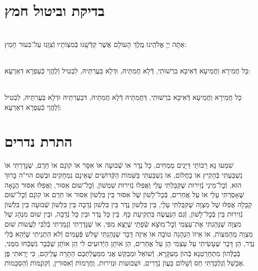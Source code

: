 \documentclass[twoside, openany, parskip=half, 11pt]{book}
\begin{document}
\chapter[בדיקת וביטול חמץ]{ בדיקת וביטול חמץ }

\\
אַתָּה יְיָ אֱלֹהֵֽינוּ מֶֽלֶךְ הָעוֹלָם אֲשֶׁר קִדְּֿשָֽׁנוּ בְּֿמִצְוֹתָיו וְֿצִוָּֽנוּ עַל־בִּעוּר חָמֵץ:


\\
כָּל חֲמִירָא וַחֲמִיעָא דְּֿאִיכָּא בִרְשׁוּתִי, דְּֿלָא חֲמִתֵּיהּ, וּדְלָא בַּעֲרִתֵּיהּ, לִבְטִיל וְֿלֶהֱוֵי כְּֿעַפְרָא דִאַרְעָא:


\\
כָּל חֲמִירָא וַחֲמִיעָא דְּֿאִיכָּא בִרְשׁוּתִי, דַּחֲמִתֵּיהּ דְּֿלָא חֲמִתֵּיהּ, דּבַעַרִתֵּיהּ וּדְלָא בַּעֲרִתֵּיהּ, לִבְטִיל וְֿלֶהֱוֵי כְּֿעַפְרָא דִאַרְעָא:



\chapter[התרת נדרים]{ התרת נדרים }


שִׁמְעוּ נָא רַבּוׂתַי דַּיָּנִים מֻמְחִים, כָּל נֶדֶר אוׂ שְֿׁבוּעָה אוׂ אִסָּר אוׂ קוׂנָם אוׂ חֵרֶם, שֶׁנָּדַרְתִּי אוׂ נִשְׁבַּעְתִּי בְּֿהָקִיץ אוׂ בַחֲלוׂם, אוׂ נִשְׁבַּעְתִּי בַּשֵּׁמוׂת הַקְּֿדוׂשִׁים שֶׁאֵינָם נִמְחָקִים וּבְשֵׁם הוי"ה בָּרוּךְ הוּא, וְֿכׇל־מִינֵי נְֿזִירוּת שֶׁקִּבַּלְתִּי עָלַי וַאֲפִלּוּ נְֿזִירוּת שִׁמְשׁוׂן, וְֿכׇל־שׁוּם אִסּוּר, וַאֲפִלּוּ אִסּוּר הֲנָאָה שֶׁאָסַרְתִּי עָלַי אוׂ עַל אֲחֵרִים, בְּֿכׇל־לָשׁוׂן שֶׁל אִסּוּר בֵּין בִּלְשׁוׂן אִסּוּר אוׂ חֵרֶם אוׂ קוׂנָם וְֿכׇל־שׁוּם קַבָּלָה אֲפִלּוּ שֶׁל מִצְוָה שֶׁקִּבַּלְתִּי עָלַי, בֵּין בִּלְשׁון נֶדֶר בֵּין בִּלְשׁון נְֿדָבָה בֵּין בִּלְשׁוׂן שְֿׁבוּעָה בֵּין בִּלְשׁוׂן נְֿזִירוּת בֵּין בְּֿכׇל־לָשׁוׂן, וְֿגַם הַנַּעֲשֶׂה בִּתְקִיעַת כָּף. בֵּין כָּל נֶדֶר וּבֵין כָּל נְֿדָבָה, וּבֵין שׁוּם מִנְהָג שֶׁל מִצְוָה שֶׁנָּהַגְתִּי אֶת־עַצְמִי וְֿכׇל־מוׂצָא שְֿׂפָתַי שֶׁיָּצָא מִפִּי, אוׂ שֶׁנָּדַרְתִּי וְֿגָמַרְתִּי בְֿלִבִּי לַעֲשוׂת שׁוּם מִצְוָה מֵהַמִּצְוׂת, אוׂ אֵיזוׂ הַנְהָגָה טוׂבָה אוׂ אֵיזֶה דָבָר שֶׁנָּהַגְתִּי שָׁלשׁ פְּֿעָמִים וְֿלא הִתְנֵיתִי שֶׁיְּֿהֵא בְּֿלִי נֶדֶר, הֵן דָּבָר שֶׁעָשִׂיתִי עַל עַצְמִי הֵן עַל אֲחֵרִים, הֵן אוׂתָן הַיְֿדוּעִים לִי הֵן אוׂתָן שֶׁכְּֿבָר נִשְׁכְּֿחוּ מִמֶּנּי, בְּֿכֻלְּֿהוׂן מִתְחָרַטְנָא בְֿהוׂן מֵעִקָּרָא, וְֿשׁוׂאֵל וּמְבַקֵּשׁ אֲנִי מִמַּעֲלַתְכֶם הַתָּרָה עֲלֵיהֶם, כִּי יָרֵאתִי פֶּן אֶכָּשֵׁל וְֿנִלְכַּדְתִּי חַס וְֿשָׁלוׂם בַּעֲוׂן נְֿדָרִים, וּשְׁבוּעות וּנְזִירוּת, וַחֲרָמוׂת וְֿאִסּוּרִין, וְֿקוׂנָמוׂת וְֿהַסְכָּמוׂת.
\end{document}
